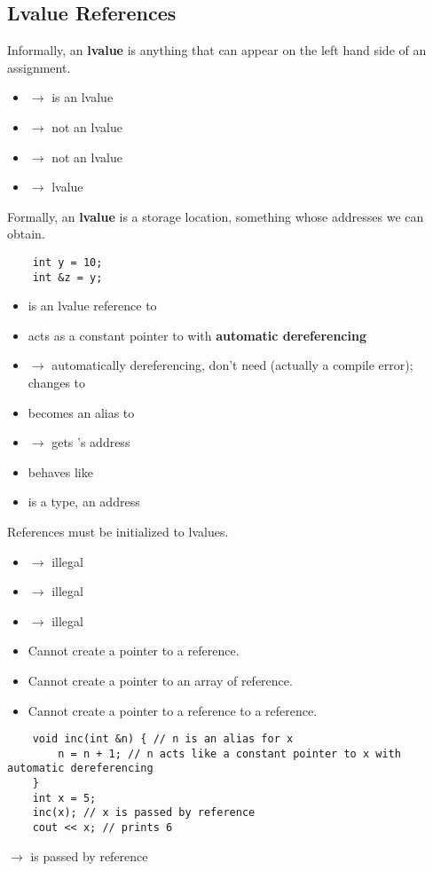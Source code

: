 \subsection{Lvalue References}
Informally, an \textbf{lvalue} is anything that can appear on the left hand side of
an assignment.
\begin{itemize}
    \item {} $ \rightarrow $  is an lvalue
    \item {} $ \rightarrow $ not an lvalue
    \item {} $ \rightarrow $ not an lvalue
    \item {} $ \rightarrow $  lvalue
\end{itemize}
Formally, an \textbf{lvalue} is a storage location, something whose addresses we
can obtain.
\begin{lstlisting}
    int y = 10;
    int &z = y;
\end{lstlisting}
\begin{itemize}
    \item {} is an lvalue reference to 
    \item {} acts as a constant pointer to  with
    \textbf{automatic dereferencing}
    \item {} $ \rightarrow $ automatically dereferencing,
    don't need  (actually a compile error); changes  to 
    \item {} becomes an alias to 
    \item {} $ \rightarrow $ gets 's address
    \item {} behaves like 
    \item {} is a type,  an address
\end{itemize}
References must be initialized to lvalues.
\begin{itemize}
    \item {} $ \rightarrow $ illegal
    \item {} $ \rightarrow $ illegal
    \item {} $ \rightarrow $ illegal
\end{itemize}
\begin{itemize}
    \item Cannot create a pointer to a reference.
    \item Cannot create a pointer to an array of reference.
    \item Cannot create a pointer to a reference to a reference.
\end{itemize}
\begin{lstlisting}
    void inc(int &n) { // n is an alias for x
        n = n + 1; // n acts like a constant pointer to x with automatic dereferencing
    }
    int x = 5;
    inc(x); // x is passed by reference
    cout << x; // prints 6
\end{lstlisting}
 $ \rightarrow $  is passed by reference